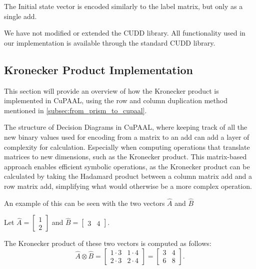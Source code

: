 The Initial state vector is encoded similarly to the label matrix, but only as a single \gls{add}.

We have not modified or extended the CUDD library.
All functionality used in our implementation is available through the standard CUDD library.


\subsection{Kronecker Product Implementation}\label{subsec:kronecker-product-implementation}
This section will provide an overview of how the Kronecker product is implemented in CuPAAL, using the row and column duplication method mentioned in \autoref{subsec:from_prism_to_cupaal}.

The structure of Decision Diagrams in CuPAAL, where keeping track of all the new binary values used for encoding from a matrix to an \gls{add} can add a layer of complexity for calculation.
Especially when computing operations that translate matrices to new dimensions, such as the Kronecker product.
This matrix-based approach enables efficient symbolic operations, as the Kronecker product can be calculated by taking the Hadamard product between a column matrix \gls{add} and a row matrix \gls{add}, simplifying what would otherwise be a more complex operation.

An example of this can be seen with the two vectors $\hat{A}$ and $\hat{B}$

Let $\hat{A} = \begin{bmatrix}
            1 \\
            2
      \end{bmatrix}$
and $\hat{B}=\begin{bmatrix}
            3 & 4
      \end{bmatrix}$.

The Kronecker product of these two vectors is computed as follows:
\begin{equation}
      \hat{A} \otimes \hat{B} = \begin{bmatrix}
            1 \cdot 3 & 1 \cdot 4 \\
            2 \cdot 3 & 2 \cdot 4
      \end{bmatrix} = \begin{bmatrix}
            3 & 4 \\
            6 & 8
      \end{bmatrix}.
      \label{eq:kronecker-product-example}
\end{equation}

